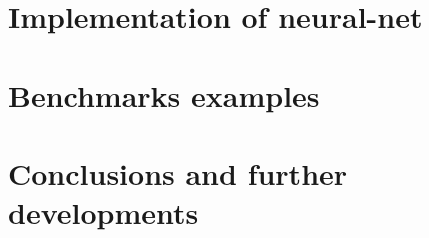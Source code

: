 \documentclass[12pt, a4paper]{report}
\theoremstyle{definition}
\begin{document}
{\chapter{Implementation of neural-net}\label{chapter3}



\chapter{Benchmarks examples}\label{chapter4}



\chapter*{Conclusions and further developments}


\newpage
\begin{thebibliography}{10}
	

\end{thebibliography}}
\end{document}

